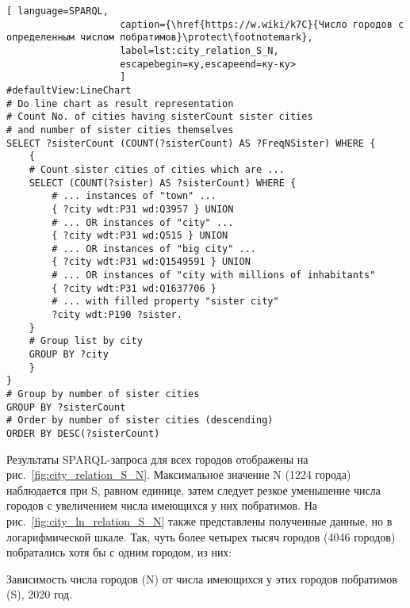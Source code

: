 \begin{lstlisting}[ language=SPARQL, 
                    caption={\href{https://w.wiki/k7C}{Число городов с определенным числом побратимов}\protect\footnotemark},
                    label=lst:city_relation_S_N, 
                    escapebegin=ку,escapeend=ку-ку>
                    ]
#defaultView:LineChart
# Do line chart as result representation
# Count No. of cities having sisterCount sister cities 
# and number of sister cities themselves
SELECT ?sisterCount (COUNT(?sisterCount) AS ?FreqNSister) WHERE {                                                                                                                                                       
	{
	# Count sister cities of cities which are ...
	SELECT (COUNT(?sister) AS ?sisterCount) WHERE {
		# ... instances of "town" ...                     
		{ ?city wdt:P31 wd:Q3957 } UNION    
		# ... OR instances of "city" ...                              
		{ ?city wdt:P31 wd:Q515 } UNION        
		# ... OR instances of "big city" ...                           
		{ ?city wdt:P31 wd:Q1549591 } UNION      
		# ... OR instances of "city with millions of inhabitants"                         
		{ ?city wdt:P31 wd:Q1637706 }                
		# ... with filled property "sister city"                     
		?city wdt:P190 ?sister.                                           
	}
	# Group list by city
	GROUP BY ?city                                                      
	}
}
# Group by number of sister cities
GROUP BY ?sisterCount         
# Order by number of sister cities (descending)                                           
ORDER BY DESC(?sisterCount)                                             
\end{lstlisting}

Результаты SPARQL-запроса для всех городов отображены на рис.~\ref{fig:city_relation_S_N}. Максимальное значение N (\num{1224} города) наблюдается при S, равном единице, затем следует резкое уменьшение числа городов с увеличением числа имеющихся у них побратимов. На рис.~\ref{fig:city_ln_relation_S_N} также представлены полученные данные, но в логарифмической шкале. Так, чуть более четырех тысяч городов (\num{4046} городов) побратались хотя бы с одним городом, из них:

\begin{marginfigure}[0.0cm]
{
\setlength{\fboxsep}{0pt}%
\setlength{\fboxrule}{1pt}%
}
  \caption{Зависимость числа городов (N) от числа имеющихся у этих городов побратимов (S), 2020 год.}
  \label{fig:city_relation_S_N}
\end{marginfigure}

